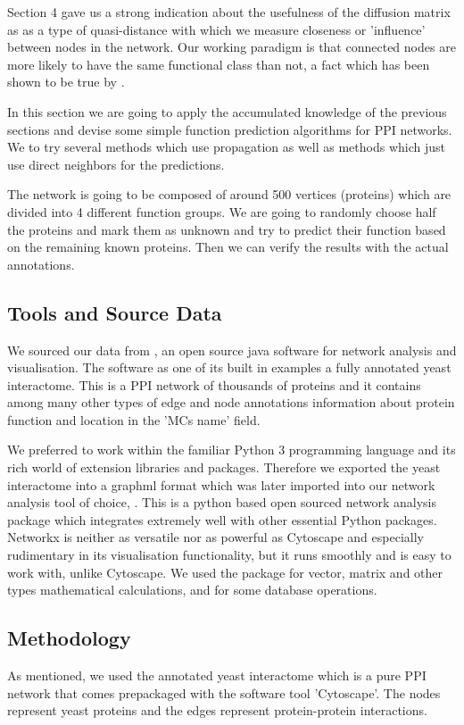 Section 4 gave us a strong indication about the usefulness of the
diffusion matrix as as a type of quasi-distance with which we
measure closeness or 'influence' between nodes in the network.
Our working paradigm is that connected nodes are more likely to have
the same functional class than not, a fact which has been shown to
be true by \textcite{schwikowski2000network}.

In this section we are going to apply the accumulated knowledge of the
previous sections and devise some simple function prediction algorithms for PPI
networks. We to try several methods which use propagation as well as
methods which just use direct neighbors for the predictions.

The network is going to be composed of around 500 vertices (proteins) which are
divided into 4 different function groups. We are going to randomly choose half
the proteins and mark them as unknown and try to predict their function based
on the remaining known proteins. Then we can verify the results with the
actual annotations.

\subsection{Tools and Source Data}

We sourced our data from \textcite{cytoscape}, an open source
java software for network analysis and visualisation. 
The software as one of its built in examples a
fully annotated yeast interactome. This is a PPI network of
thousands of proteins and it contains among many other types of
edge and node annotations information about protein function and
location in the 'MCs name' field.

We preferred to work within the familiar Python 3 programming
language and its rich world of extension libraries and packages.
Therefore we exported the yeast interactome into a graphml format
which was later imported into our network analysis tool of choice,
\textcite{networkx}. This is a python based open sourced network analysis 
package which integrates extremely well with other essential Python
packages. Networkx is neither as versatile nor as powerful as Cytoscape and
especially rudimentary in its visualisation functionality, but it
runs smoothly and is easy to work with, unlike Cytoscape.
We used the \textcite{numpy} package for vector, matrix and other
types mathematical
calculations, and \textcite{pandas} for some database operations. 

\subsection{Methodology}
As mentioned, we 
used the annotated yeast interactome which is a pure PPI network that comes
prepackaged with the
software tool 'Cytoscape'. The nodes represent yeast proteins and the edges
represent protein-protein interactions.

